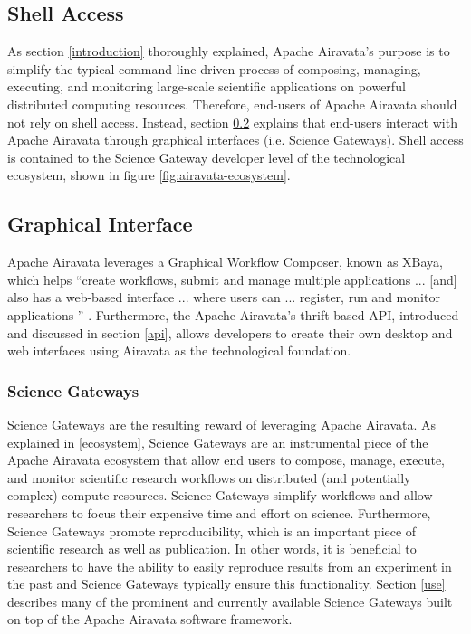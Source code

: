\documentclass[9pt,twocolumn,twoside]{../../styles/osajnl}
\begin{document}
\subsection{Shell Access} \label{shell}
As section \ref{introduction} thoroughly explained, Apache Airavata's
purpose is to simplify the typical command line driven process of
composing, managing, executing, and monitoring large-scale scientific
applications on powerful distributed computing resources. Therefore,
end-users of Apache Airavata should not rely on shell access. Instead,
section \ref{graphical} explains that end-users interact with Apache
Airavata through graphical interfaces (i.e. Science Gateways). Shell
access is contained to the Science Gateway developer level of the
technological ecosystem, shown in figure \ref{fig:airavata-ecosystem}.

\subsection{Graphical Interface} \label{graphical}
Apache Airavata leverages a Graphical Workflow Composer, known as
XBaya, which helps ``create workflows, submit and manage multiple
applications ... [and] also has a web-based interface ... where users
can ... register, run and monitor applications ''
\cite{www-documentation}. Furthermore, the Apache Airavata's
thrift-based API, introduced and discussed in section \ref{api},
allows developers to create their own desktop and web interfaces using
Airavata as the technological foundation.

\subsubsection{Science Gateways} \label{science}
Science Gateways are the resulting reward of leveraging Apache
Airavata. As explained in \ref{ecosystem}, Science Gateways are an
instrumental piece of the Apache Airavata ecosystem that allow end
users to compose, manage, execute, and monitor scientific research
workflows on distributed (and potentially complex) compute
resources. Science Gateways simplify workflows and allow researchers
to focus their expensive time and effort on science. Furthermore,
Science Gateways promote reproducibility, which is an important piece
of scientific research as well as publication. In other words, it is
beneficial to researchers to have the ability to easily reproduce
results from an experiment in the past and Science Gateways typically
ensure this functionality. Section \ref{use} describes many of the
prominent and currently available Science Gateways built on top of the
Apache Airavata software framework.
\end{document}
